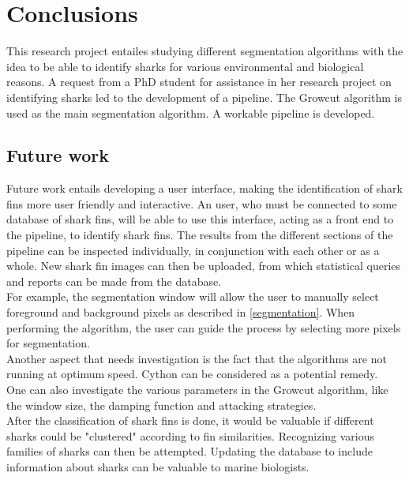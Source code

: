 \documentclass[a4paper,10pt]{article}
\begin{document}
\newpage
\section{Conclusions}
This research project entailes studying different segmentation algorithms with the idea to be able to identify sharks for various environmental and biological reasons.
A request from a PhD student for assistance in her research project on identifying sharks led to the development of a pipeline. The Growcut algorithm is used as the main segmentation algorithm. A workable pipeline is developed. \\

\subsection{Future work}
Future work entails developing a user
interface, making the identification of shark fins more user friendly and interactive.
An user, who must be connected to some database of shark fins, will be able to
use this interface, acting as a front end to the
  pipeline, to identify shark fins.  The
results from the different sections of the pipeline can be
  inspected individually, in
conjunction with each other or as a whole.  New shark fin images can then be
uploaded, from which statistical queries and reports can be
made from the database. \\

For example, the segmentation window will allow the user to manually select foreground and background pixels as described in \ref{segmentation}.
When performing the algorithm, the user can guide the process by selecting more pixels for segmentation. \\

Another aspect that needs investigation is the fact that the algorithms are not
running at optimum speed.  Cython can be considered
as a potential remedy. \\

One can also investigate the various parameters in the Growcut algorithm, like the window size, the damping function and attacking strategies. \\

After the classification of shark fins is done, it would be valuable if different sharks could be "clustered" according to fin similarities.
Recognizing various families of sharks can then be attempted.  Updating the database to include information about sharks can be valuable to marine biologists.  \\

\newpage

\end{document}
